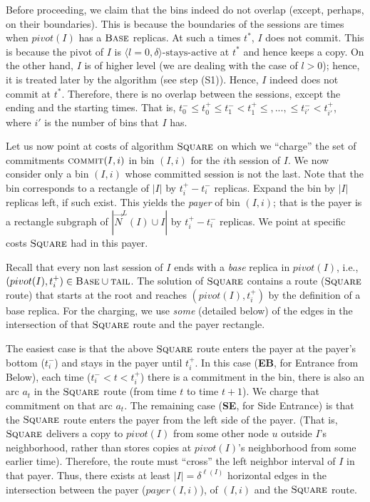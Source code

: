 \documentclass[11pt]{article}
\newcommand{\neigh}[0]{N}
\newcommand{\stayactive}[0]{\mbox{stays-active}}
\newcommand{\lfun}[1]{\ell(#1)}
\newcommand{\Base}[0]{\mbox{\sc Base}}
\newcommand{\DBase}[0]{{\mbox{\sc Base}}}
\newcommand{\Square}[0]{\mbox{\sc Square}}
\newcommand{\tminus}[2]{t^{-}_{#1}#2}
\newcommand{\tplus}[1]{t^{+}_{#1}}
\newcommand{\payer}[0]{payer}
\newcommand{\tail}[0]{\mbox{\sc tail}}
\newcommand{\pivot}[0]{pivot}
\newcommand{\DNLI}[1]{\overrightarrow{\neigh}^{L}(#1)}
\newcommand{\DCOMMIT}[0]{\mbox{\sc commit}}
\begin{document}
Before proceeding, we claim that the bins indeed do not overlap (except, perhaps, on their boundaries).
This is because the boundaries of the sessions are times when $\pivot(I)$ has a $\Base$ replicas.
At such a times $t^*$, $I$ does not commit.
This is because the pivot of $I$ is $\langle l=0,\delta\rangle$-$\stayactive$ at $t^*$ and hence keeps a copy.
On the other hand, $I$ is of higher level
(we are dealing with the case of $l>0$);
hence, it is treated later by the algorithm (see step (S1)).
Hence, $I$ indeed does not commit at $t^*$.
Therefore, there is no overlap between the sessions, except the ending and the starting times.
That is, $\tminus{0}\leq\tplus{0}\leq\tminus{1}<\tplus{1}\leq,...,\leq\tminus{i'}<\tplus{i'}$,
where $i'$ is the number of bins that $I$ has.


Let us now point at costs of algorithm $\Square$ on which we ``charge'' the set of commitments $\DCOMMIT(I,i)$ in bin $(I,i)$ for the $i$th session of $I$.
We now consider only a bin $(I,i)$ whose  committed session  is not the last.
Note that the bin corresponds to a rectangle of $|I|$ by $t_i^+ - t_i^-$ replicas.
Expand the bin by $|I|$ replicas left, if such exist.
This yields the {\em payer} of bin $(I,i)$; that is the payer is a rectangle subgraph of $|\DNLI{I}\cup{I}|$
by $t_i^+ - t_i^-$ replicas.
We point at specific costs $\Square$ had in this payer.


Recall that every non last session of $I$ ends with a {\em base} replica in $\pivot(I)$, i.e., $(\pivot(I),\tplus{i})\in\DBase\cup\tail$.
The solution of $\Square$ contains a route ($\Square$ route) that starts at the root and reaches
$(\pivot(I),\tplus{i})$
by the definition of a base replica.
For the charging, we use {\em some} (detailed below) of the edges in the intersection of that $\Square$ route and the payer rectangle.


The easiest case is that the above $\Square$ route enters the payer at the payer's bottom ($t_i^-$) and stays in the payer until $t_i^+$.
In this case ({\bf EB}, for Entrance from Below), each time ($t_i^-  < t < t_i^+$) there is a commitment in the bin,
there is also an arc $a_t$ in the $\Square$ route (from time $t$ to time $t+1$).
We charge that commitment on that arc $a_t$.
The remaining case ({\bf SE}, for Side Entrance) is that
the $\Square$ route enters the payer from the left side of the payer.
(That is, $\Square$ delivers a copy to $\pivot(I)$ from some other node $u$ outside $I$'s neighborhood,
rather than stores copies at $\pivot(I)$'s neighborhood from some earlier time).
Therefore, the route must ``cross'' the left neighbor interval of $I$ in that payer.
Thus, there exists at least $|I|=\delta^{\lfun{I}}$ horizontal edges in the intersection between the payer ($\payer(I,i)$), of $(I,i)$  and
the $\Square$ route.
\end{document}
